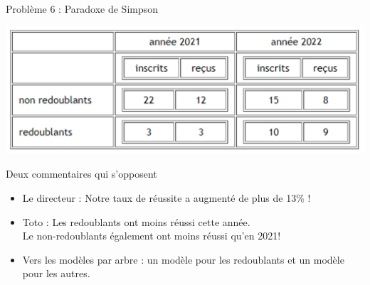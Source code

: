\documentclass[10pt]{beamer}
\begin{document}

\begin{frame}{Problème 6 : Paradoxe de Simpson} 
 
 \begin{center}
\includegraphics[height=0.34\textwidth]{figures/SIMPSON_tableau.png}
\end{center} 

\begin{block}{Deux commentaires qui s'opposent}
\small {\begin{itemize}
\item Le directeur : Notre taux de réussite a augmenté de plus de 13\% !
\item Toto : Les redoublants ont moins réussi cette année. \\
            \hspace{0.06\textwidth} Le non-redoublants également ont moins réussi qu'en 2021!
\item Vers les modèles par arbre : un modèle pour les redoublants et un modèle pour les autres. 
\end{itemize}}
\end{block} 

\end{frame}
\end{document}
